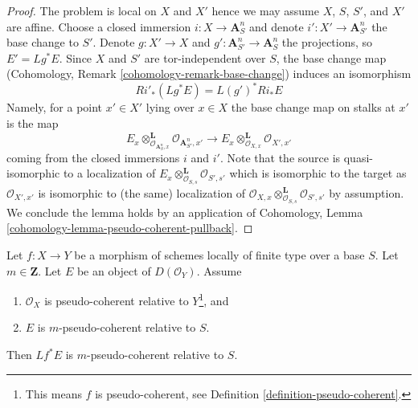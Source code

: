 \begin{proof}
The problem is local on $X$ and $X'$ hence we may assume $X$, $S$, $S'$,
and $X'$ are affine. Choose a closed immersion $i : X \to \mathbf{A}^n_S$
and denote $i' : X' \to \mathbf{A}^n_{S'}$ the base change to $S'$.
Denote $g : X' \to X$ and $g' : \mathbf{A}^n_{S'} \to \mathbf{A}^n_S$
the projections, so $E' = Lg^*E$. Since $X$ and $S'$ are tor-independent
over $S$, the base change map
(Cohomology, Remark \ref{cohomology-remark-base-change})
induces an isomorphism
$$
Ri'_*(Lg^*E) = L(g')^*Ri_*E
$$
Namely, for a point $x' \in X'$ lying over $x \in X$ the base change
map on stalks at $x'$ is the map
$$
E_x \otimes_{\mathcal{O}_{\mathbf{A}^n_S, x}}^\mathbf{L}
\mathcal{O}_{\mathbf{A}^n_{S'}, x'}
\longrightarrow
E_x \otimes_{\mathcal{O}_{X, x}}^\mathbf{L}
\mathcal{O}_{X', x'}
$$
coming from the closed immersions $i$ and $i'$. Note that the source
is quasi-isomorphic to a localization of
$E_x \otimes_{\mathcal{O}_{S, s}}^\mathbf{L} \mathcal{O}_{S', s'}$
which is isomorphic to the target as
$\mathcal{O}_{X', x'}$ is isomorphic to (the same) localization of
$\mathcal{O}_{X, x} \otimes_{\mathcal{O}_{S, s}}^\mathbf{L}
\mathcal{O}_{S', s'}$ by assumption. We conclude the lemma holds
by an application of
Cohomology, Lemma \ref{cohomology-lemma-pseudo-coherent-pullback}.
\end{proof}

\begin{lemma}
\label{lemma-pull-relative-pseudo-coherent}
Let $f : X \to Y$ be a morphism of schemes locally of finite type
over a base $S$. Let $m \in \mathbf{Z}$. Let $E$ be an object of
$D(\mathcal{O}_Y)$. Assume
\begin{enumerate}
\item $\mathcal{O}_X$ is pseudo-coherent relative to $Y$\footnote{This
means $f$ is pseudo-coherent, see
Definition \ref{definition-pseudo-coherent}.}, and
\item $E$ is $m$-pseudo-coherent relative to $S$.
\end{enumerate}
Then $Lf^*E$ is $m$-pseudo-coherent relative to $S$.
\end{lemma}

